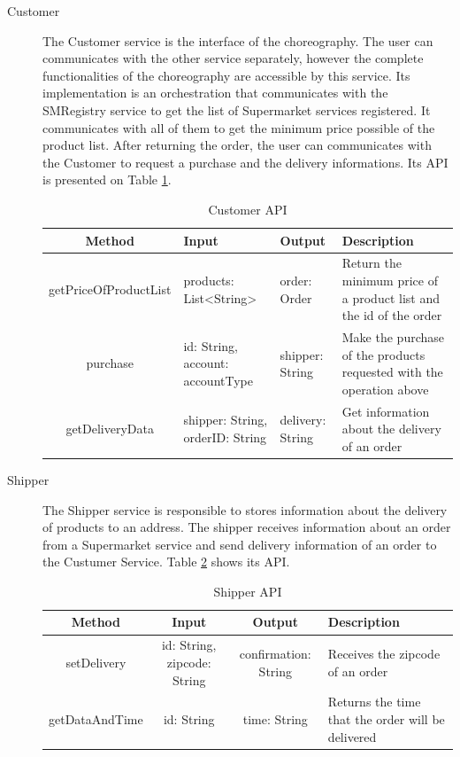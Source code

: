 \begin{description}
\item[Customer] The Customer service is the interface of the choreography. The user can communicates with the other service separately, however the complete functionalities of the choreography are accessible by this service. Its implementation is an orchestration that communicates with the SMRegistry service to get the list of Supermarket services registered. It communicates with all of them to get the minimum price possible of the product list. After returning the order, the user can communicates with the Customer to request a purchase and the delivery informations. Its API is presented on Table \ref{customerapi}.
	\begin{table}[htdp]
	\caption{Customer API}
	\begin{center}
	\begin{tabular}{|c|m{3.5cm}|m{3.5cm}|m{4cm}|}
		\hline
		Method				& Input					& Output 					& Description \\ \hline
		getPriceOfProductList	& products: List<String> & order: Order & Return the minimum price of a product list and the id of the order\\ \hline
		purchase 				& id: String, account: accountType & shipper: String & Make the purchase of the products requested with the operation above \\ \hline
		getDeliveryData 		& shipper: String, orderID: String & delivery: String & Get information about the delivery of an order \\ \hline
		
	\end{tabular}
	\end{center}
	\label{customerapi}
	\end{table}%

\item[Shipper] The Shipper service is responsible to stores information about the delivery of products to an address. The shipper receives information about an order from a Supermarket service and send delivery information of an order to the Custumer Service. Table \ref{shipperapi} shows its API.

	\begin{table}[htdp]
	\caption{Shipper API}
	\begin{center}
		\begin{tabular}{|c|c|c|m{4cm}|}
		\hline
		Method			& Input					& Output 					& Description \\ \hline
		setDelivery		& id: String, zipcode: String	& confirmation: String		& Receives the zipcode of an order \\ \hline
		getDataAndTime	& id: String				& time: String				& Returns the time that the order will be delivered \\ \hline
	\end{tabular}
	\end{center}
	\label{shipperapi}
	\end{table}%
	\end{description}
	

